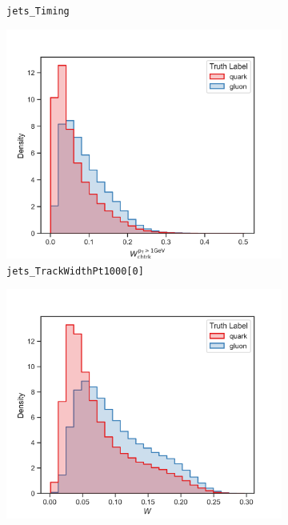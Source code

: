 \begin{figure}[!htb]
\begin{subfigure}[t]{0.49\textwidth}
		\caption{\texttt{jets\_Timing}}
		\label{fig:highlevel_19}
	\end{subfigure}
	\begin{subfigure}[t]{0.49\textwidth}
		\includegraphics[width=1\textwidth]{src/plots/distributions/highlevel/jets_TrackWidthPt1000[0].png}
		\caption{\texttt{jets\_TrackWidthPt1000[0]}}
		\label{fig:highlevel_20}
	\end{subfigure}
	\begin{subfigure}[t]{0.49\textwidth}
		\includegraphics[width=1\textwidth]{src/plots/distributions/highlevel/jets_Width.png}

\end{subfigure}
\end{figure}
